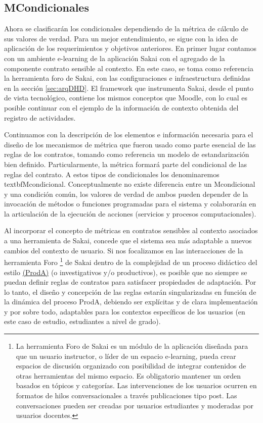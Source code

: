 \begin{itemize}
\subsection{MCondicionales}


Ahora se clasificarán los condicionales dependiendo de la métrica de cálculo de sus valores de verdad. Para un mejor entendimiento, se sigue con la idea de aplicación de los requerimientos y objetivos anteriores. En primer lugar contamos con un ambiente e-learning de la aplicación Sakai con el agregado de la componente contrato sensible al contexto. En este caso, se toma como referencia la herramienta foro de Sakai, con las configuraciones e infraestructura definidas en la sección \ref{sec:arqDHD}. El framework que instrumenta Sakai, desde el punto de vista tecnológico, contiene los mismos conceptos que Moodle, con lo cual es posible continuar con el ejemplo de la información de contexto obtenida del registro de actividades. 


Continuamos con la descripción de los elementos e información necesaria para el diseño de los mecanismos de métrica que fueron usado como parte esencial de las reglas de los contratos, tomando como referencia un modelo de estandarización bien definido. Particularmente, la métrica formará parte del condicional de las reglas del contrato. A estos tipos de condicionales los denominaremos textbf{Mcondicional}. Conceptualmente no existe diferencia entre un Mcondicional y una condición común, los valores de verdad de ambos pueden depender de la invocación de métodos o funciones programadas para el sistema y colaborarán en la articulación de la ejecución de acciones (servicios y procesos computacionales). 

Al incorporar el concepto de métricas en contratos sensibles al contexto asociados a una herramienta de Sakai, concede que el sistema sea más adaptable a nuevos cambios del contexto de usuario. Si nos focalizamos en las interacciones de la herramienta Foro \footnote{La herramienta Foro de Sakai es un módulo de la aplicación diseñada para que un usuario instructor, o líder de un espacio e-learning, pueda crear espacios de discusión organizado con posibilidad de integrar contenidos de otras herramientas del mismo espacio. Es obligatorio mantener un orden basados en tópicos y categorías. Las intervenciones de los usuarios ocurren en formatos de hilos conversacionales a través publicaciones tipo post. Las conversaciones pueden ser creadas por usuarios estudiantes y moderadas por usuarios docentes.} de Sakai dentro de la complejidad de un proceso didáctico del estilo \hyperref[ProdA]{(ProdA)} (o investigativos y/o productivos), es posible que no siempre se puedan definir reglas de contratos para satisfacer propiedades de adaptación. Por lo tanto, el diseño y concepción de las reglas estarán singularizadas en función de la dinámica del proceso ProdA, debiendo ser explícitas y de clara implementación y por sobre todo, adaptables para los contextos específicos de los usuarios (en este caso de estudio, estudiantes a nivel de grado).



\end{itemize}
